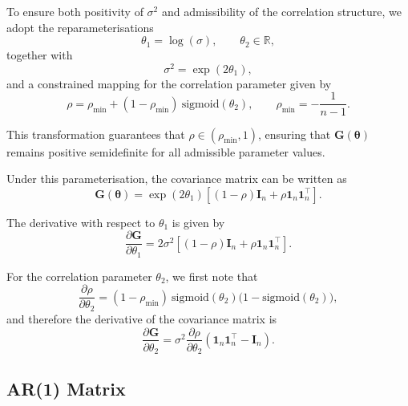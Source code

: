 \documentclass[
  letterpaper,
  DIV=11,
  numbers=noendperiod]{scrartcl}
\begin{document}
To ensure both positivity of \(\sigma^2\) and admissibility of the
correlation structure, we adopt the reparameterisations \begin{equation}
\theta_1 = \log(\sigma), \qquad \theta_2 \in \mathbb{R},
\end{equation} together with \begin{equation}
\sigma^2 = \exp(2\theta_1),
\end{equation} and a constrained mapping for the correlation parameter
given by \begin{equation}
\rho = \rho_{\min} + (1 - \rho_{\min})~ \mathrm{sigmoid}(\theta_2),
\qquad \rho_{\min} = -\frac{1}{n - 1}.
\end{equation}

This transformation guarantees that \(\rho \in (\rho_{\min}, 1)\),
ensuring that \(\symbf{G}(\symbf{\theta})\) remains positive
semidefinite for all admissible parameter values.

Under this parameterisation, the covariance matrix can be written as
\begin{equation}
\symbf{G}(\symbf{\theta})
= \exp(2\theta_1)\left[(1 - \rho)\symbf{I}_n + \rho \mathbf{1}_n \mathbf{1}_n^\top \right].
\end{equation}

The derivative with respect to \(\theta_1\) is given by \begin{equation}
\frac{\partial \symbf{G}}{\partial \theta_1}
= 2\sigma^2 \left[(1 - \rho)\symbf{I}_n + \rho \mathbf{1}_n \mathbf{1}_n^\top \right].
\end{equation}

For the correlation parameter \(\theta_2\), we first note that
\begin{equation}
\frac{\partial \rho}{\partial \theta_2}
= (1 - \rho_{\min})~ \mathrm{sigmoid}(\theta_2)\big(1 - \mathrm{sigmoid}(\theta_2)\big),
\end{equation} and therefore the derivative of the covariance matrix is
\begin{equation}
\frac{\partial \symbf{G}}{\partial \theta_2}
= \sigma^2 \frac{\partial \rho}{\partial \theta_2}
\left(\mathbf{1}_n \mathbf{1}_n^\top - \symbf{I}_n \right).
\end{equation}

\subsection{AR(1) Matrix}\label{ar1-matrix}
\end{document}
